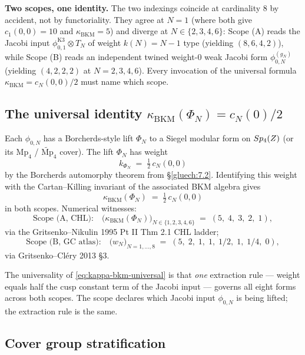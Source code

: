 \textbf{Two scopes, one identity.} The two indexings coincide at cardinality $8$ by accident, not by functoriality. They agree at $N = 1$ (where both give $c_1(0,0) = 10$ and $\kappa_{\mathrm{BKM}} = 5$) and diverge at $N \in \{2, 3, 4, 6\}$: Scope (A) reads the Jacobi input $\phi_{0,1}^{\mathrm{K3}} \otimes T_N$ of weight $k(N) = N-1$ type (yielding $(8, 6, 4, 2)$), while Scope (B) reads an independent twined weight-$0$ weak Jacobi form $\phi_{0, N}^{(g_N)}$ (yielding $(4, 2, 2, 2)$ at $N = 2, 3, 4, 6$). Every invocation of the universal formula $\kappa_{\mathrm{BKM}} = c_N(0, 0)/2$ must name which scope.

\subsection{The universal identity $\kappa_{\mathrm{BKM}}(\Phi_N) = c_N(0)/2$}

Each $\phi_{0, N}$ has a Borcherds-style lift $\Phi_N$ to a Siegel modular form on $Sp_4(Z)$ (or its $\mathrm{Mp}_4$ / $\widetilde{\mathrm{Mp}}_4$ cover). The lift $\Phi_N$ has weight
\[
  k_{\Phi_N} \;=\; \tfrac12 \, c_N(0, 0)
\]
by the Borcherds automorphy theorem from \S\ref{gluech:7.2}. Identifying this weight with the Cartan--Killing invariant of the associated BKM algebra gives
\begin{equation}
  \kappa_{\mathrm{BKM}}(\Phi_N) \;=\; \tfrac12 \, c_N(0, 0)
  \label{eq:kappa-bkm-universal}
\end{equation}
in both scopes. Numerical witnesses:
\[
  \text{Scope (A, CHL):}\quad \bigl(\kappa_{\mathrm{BKM}}(\Phi_N)\bigr)_{N \in \{1, 2, 3, 4, 6\}} \;=\; (5, \; 4, \; 3, \; 2, \; 1),
\]
via the Gritsenko--Nikulin 1995 Pt II Thm 2.1 CHL ladder;
\[
  \text{Scope (B, GC atlas):}\quad \bigl(w_N\bigr)_{N = 1, \ldots, 8} \;=\; (5, \; 2, \; 1, \; 1, \; 1/2, \; 1, \; 1/4, \; 0),
\]
via Gritsenko--Cl\'ery 2013 \S 3.

\noindent The universality of \eqref{eq:kappa-bkm-universal} is that \emph{one} extraction rule --- weight equals half the cusp constant term of the Jacobi input --- governs all eight forms across both scopes. The scope declares which Jacobi input $\phi_{0, N}$ is being lifted; the extraction rule is the same.

\subsection{Cover group stratification}

